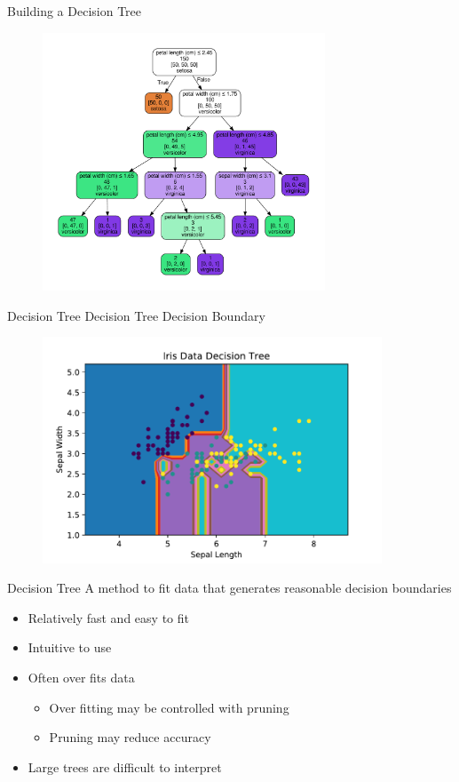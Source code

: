 \documentclass[10pt]{beamer}
\begin{document}
\begin{frame}{Building a Decision Tree}
		\begin{figure}	
			\includegraphics[width=0.75\textwidth, center, trim=0cm 0cm 0 0cm]{images/DT_6_simple.pdf}
	\end{figure}
\end{frame}

\begin{frame}{Decision Tree}
Decision Tree Decision Boundary
	\begin{figure}	
		\includegraphics[width=0.9\textwidth, center, trim=0cm 0cm 0 0cm]{images/Iris_Data_DT.pdf}
	\end{figure}
\end{frame}

\begin{frame}{Decision Tree}
A method to fit data that generates reasonable decision boundaries
	\begin{itemize}
		\item Relatively fast and easy to fit
		\item Intuitive to use
		\item Often over fits data
			\begin{itemize}		
				\item Over fitting may be controlled with pruning
				\item Pruning may reduce accuracy
			\end{itemize}
		\item Large trees are difficult to interpret
	\end{itemize}
\end{frame}
\end{document}

